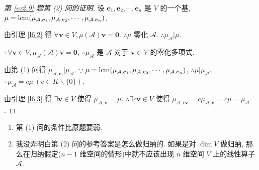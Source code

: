 \documentclass[color=black,device=normal,lang=cn,mode=geye]{elegantnote}
\begin{document}
\begin{proof}[第 \ref{ex2.9} 题第 (2) 问的证明]
    设 $\boldsymbol{e}_1,\boldsymbol{e}_2,\cdots,\boldsymbol{e}_n$ 是 $V$ 的一个基, $\mu=\operatorname{lcm}(\mu_{\mathcal{A},\boldsymbol{e}_1},\mu_{\mathcal{A},\boldsymbol{e}_2},\cdots,\mu_{\mathcal{A},\boldsymbol{e}_n})$.

    由引理 \ref{l6.2} 得 $\forall\boldsymbol{v}\in V,\mu(\mathcal{A})\boldsymbol{v}=\boldsymbol{0}$. $\therefore\mu$ 零化 $\mathcal{A}$. $\therefore\mu_{\mathcal{A}}|\mu$.

    $\because\forall\boldsymbol{v}\in V,\mu_{\mathcal{A}}(\mathcal{A})\boldsymbol{v}=\boldsymbol{0}$, $\therefore\mu_{\mathcal{A}}$ 是 $\mathcal{A}$ 对于 $\boldsymbol{v}\in V$ 的零化多项式.
    
    由第 (1) 问得 $\mu_{\mathcal{A},\boldsymbol{e}_i}|\mu_{\mathcal{A}}$. $\because\mu=\operatorname{lcm}(\mu_{\mathcal{A},\boldsymbol{e}_1},\mu_{\mathcal{A},\boldsymbol{e}_2},\cdots,\mu_{\mathcal{A},\boldsymbol{e}_n})$, $\therefore\mu|\mu_{\mathcal{A}}$. $\therefore\mu_{\mathcal{A}}=c\mu\ (c\in K\backslash\{0\})$.

    由引理 \ref{l6.3} 得 $\exists\boldsymbol{v}\in V$ 使得 $\mu_{\mathcal{A},\boldsymbol{v}}=\mu$. $\therefore\exists c\boldsymbol{v}\in V$ 使得 $\mu_{\mathcal{A},c\boldsymbol{v}}=c\mu_{\mathcal{A},\boldsymbol{v}}=c\mu=\mu_{\mathcal{A}}$.
\end{proof}
\begin{note}
    \begin{enumerate}
        \item 第 (1) 问的条件比原题要弱.
        \item 我没弄明白第 (2) 问的参考答案是怎么做归纳的. 如果是对 $\dim V$ 做归纳, 那么在归纳假定($n-1$ 维空间的情形)中就不应该出现 $n$ 维空间 $V$ 上的线性算子 $\mathcal{A}$.
    \end{enumerate}
\end{note}
\end{document}
